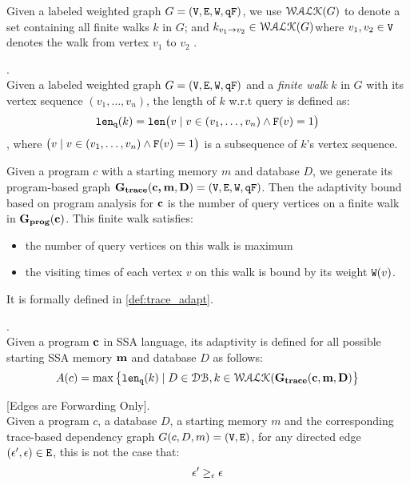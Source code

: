 %
Given a labeled weighted graph $G = (\mathtt{V}, \mathtt{E}, \mathtt{W}, \mathtt{qF})$, 
we use $\mathcal{WALK}(G)$ to denote a set containing all finite walks $k$ in $G$;
and $k_{v_1 \to v_2} \in \mathcal{WALK}(G)$where $v_1, v_2 \in \mathtt{V}$ denotes the walk from vertex $v_1$ to $v_2$ .
%
%
\begin{defn}.
\label{def:qlen}
\\
Given a labeled weighted graph $G = (\mathtt{V}, \mathtt{E}, \mathtt{W}, \mathtt{qF})$ and a \emph{finite walk} $k$ in $G$ with its vertex sequence $(v_1, \ldots, v_{n})$, the length of $k$ w.r.t query is defined as:
\[
  \mathtt{len}_{\tt q}(k) = \mathtt{len}\big(
  v \mid v \in (v_1, \ldots, v_{n}) \land \mathtt{F}(v) = 1 \big)
\]
, where $\big(v \mid v \in (v_1, \ldots, v_{n}) \land \mathtt{F}(v) = 1 \big)$ is a subsequence of $k$'s vertex sequence.
\end{defn}
%
Given a program $c$ with a starting memory $m$ and database $D$, we generate its program-based graph 
$\bf{G_{trace}}({\boldsymbol{\mathbf{c, m}}}, D) = (\mathtt{V}, \mathtt{E}, \mathtt{W}, \mathtt{qF})$.
%
Then the adaptivity bound based on program analysis for ${\boldsymbol{\mathbf{c}}}$ is the number of query vertices on a finite walk in $\mathtt{\bf{G_{prog}}}({\boldsymbol{\mathbf{c}}})$. This finite walk satisfies:
%
\begin{itemize}
\item the number of query vertices on this walk is maximum
\item the visiting times of each vertex $v$ on this walk is bound by its weight $\mathtt{W}(v)$.
\end{itemize}
%
It is formally defined in \ref{def:trace_adapt}.
%
\begin{defn}
.
\label{def:trace_adapt}
\\
Given a program ${\boldsymbol{\mathbf{c}}}$ in SSA language, 
its adaptivity is defined for all possible starting SSA memory ${\boldsymbol{\mathbf{m}}}$ and database $D$ as follows:
%
$$
A(c) = \max \big 
\{ \mathtt{len}_{\tt q}(k) \mid D \in \mathcal{DB} , k \in \mathcal{WALK}(\bf{G_{trace}}(c, m, D) \big \} 
$$
\end{defn}
%
%
%
%
\begin{lem}
\label{lem:edgeforwarding}
[Edges are Forwarding Only].
\\
%
Given a program $c$, a database $D$, a starting memory $m$ and the corresponding trace-based dependency graph $G(c,D,m) = (\mathtt{V}, \mathtt{E})$, 
for any directed edge $(\mathtt{\epsilon}', \mathtt{\epsilon}) \in \mathtt{E}$, 
this is not the case that:
%
$$\mathtt{\epsilon}' \geq_{\mathtt{\epsilon}} \mathtt{\epsilon}$$
%
\end{lem}
